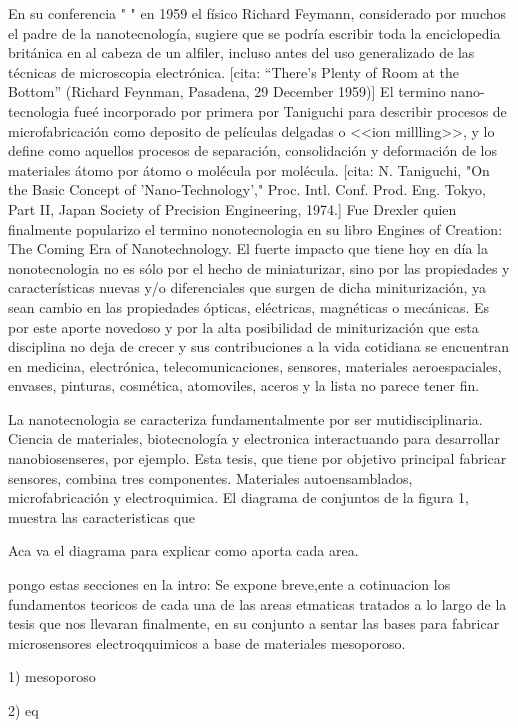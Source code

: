 En su conferencia " " en 1959 el físico Richard Feymann, considerado por muchos el padre de la nanotecnología, sugiere que se podría escribir toda la enciclopedia británica en al cabeza de un alfiler, incluso antes del uso generalizado de las técnicas de microscopia electrónica. [cita: “There’s Plenty of Room at the Bottom”
(Richard Feynman, Pasadena, 29 December 1959)] El termino nano-tecnologia fueé incorporado por primera por Taniguchi para describir procesos de microfabricación como deposito de películas delgadas o <<ion millling>>, y lo define como aquellos procesos de separación, consolidación y deformación de los materiales átomo por átomo o molécula por molécula. [cita: N. Taniguchi, "On the Basic Concept of 'Nano-Technology'," Proc. Intl. Conf. Prod. Eng. Tokyo, Part II, Japan Society of Precision Engineering, 1974.] Fue Drexler quien finalmente popularizo el termino nonotecnologia en su libro Engines of Creation: The Coming Era of Nanotechnology. El fuerte impacto que tiene hoy en día la nonotecnologia no es sólo por el hecho de miniaturizar, sino por las propiedades y características nuevas y/o diferenciales que surgen de dicha miniturización, ya sean cambio en las propiedades ópticas, eléctricas, magnéticas o mecánicas. Es por este aporte novedoso y por la alta posibilidad de miniturización que esta disciplina no deja de crecer y sus contribuciones a la vida cotidiana se encuentran en medicina, electrónica, telecomunicaciones, sensores, materiales aeroespaciales, envases, pinturas, cosmética, atomoviles, aceros y la lista no parece tener fin.

La nanotecnologia se caracteriza fundamentalmente por ser mutidisciplinaria. Ciencia de materiales, biotecnología y electronica interactuando para desarrollar nanobiosenseres, por ejemplo. Esta tesis, que tiene por objetivo principal fabricar sensores, combina tres componentes. Materiales autoensamblados, microfabricación y electroquimica. 
El diagrama de conjuntos de la figura 1, muestra las caracteristicas que 

Aca va el diagrama para explicar como aporta cada area.

 
pongo estas secciones en la intro:
Se expone breve,ente a cotinuacion los fundamentos teoricos de cada una de las areas etmaticas tratados a lo largo de la tesis que nos llevaran finalmente, en su conjunto a sentar las bases para fabricar microsensores electroqquimicos a base de materiales mesoporoso.

1) mesoporoso

2) eq

